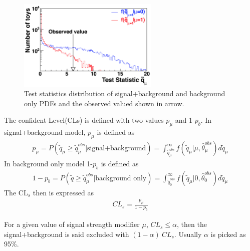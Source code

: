 \begin{figure}[!tbp] 
\centering
\includegraphics[width=0.6\textwidth]{chapter7/Test_statistics.png}
\caption{Test statistics distribution of signal+background and background only PDFs and the observed valued shown in arrow.}
\label{fig:teststatistics}
\end{figure}
 
The confident Level(CLs) is defined with two values $p_{\mu}$ and 1-$p_{b}$. In signal+background model, $p_{\mu}$ is defined as
\begin{align*}
p_{\mu}=P(\tilde{q}_{\mu}\geq  \tilde{q}_{\mu}^{obs}  |\textrm{signal+background})=\int^{\infty}_{\tilde{q}_{\mu}^{obs}}f(\tilde{q}_{\mu}|\mu,\hat{\theta}_{\mu}^{obs})d \tilde{q}_{\mu}
\end{align*}
In background only model 1-$p_{b}$ is defined as
\begin{align*}
1-p_{b}=P(\tilde{q}\geq  \tilde{q}_{\mu}^{obs} | \textrm{background only})=\int^{\infty}_{\tilde{q}_{0}^{obs}}f(\tilde{q}_{\mu}|0,\hat{\theta}_{0}^{obs})d \tilde{q}_{\mu}
\end{align*}
The $\textrm{CL}_{s}$ then is expressed as
\begin{align*}
CL_{s}=\frac{p_{\mu}}{1-p_{b}}
\end{align*}

For a given value of signal strength modifier $\mu$, $CL_{s}\leq\alpha$, then the signal+background is said excluded with $(1-\alpha)~ CL_{s}$. Usually $\alpha$ is picked as 95\%.

